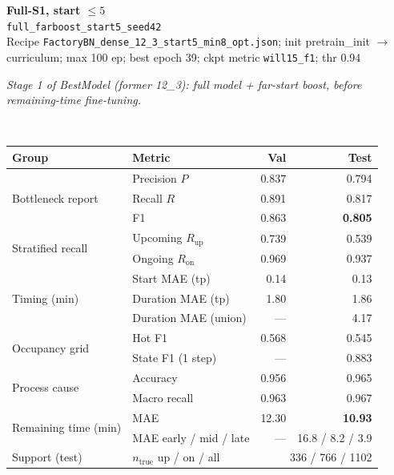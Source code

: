 \documentclass[9pt,a4paper,twocolumn]{extarticle}
\begin{document}
\noindent\begin{minipage}{\columnwidth}
\begin{center}
{\small\bfseries Full-S1, start $\le 5$}\\
{\scriptsize\texttt{full\_farboost\_start5\_seed42}}\\
{\scriptsize Recipe \texttt{FactoryBN\_dense\_12\_3\_start5\_min8\_opt.json}; init pretrain\_init $\to$ curriculum; max 100 ep; best epoch 39; ckpt metric \texttt{will15\_f1}; thr 0.94}\\[1pt]
\parbox{0.96\columnwidth}{\scriptsize\itshape Stage 1 of BestModel (former 12\_3): full model + far-start boost, before remaining-time fine-tuning.}\\[2pt]
\scriptsize\setlength{\tabcolsep}{3pt}
\begin{tabular}{llrr}
\toprule
Group & Metric & Val & Test \\
\midrule
\multirow{3}{*}{Bottleneck report}
  & Precision $P$ & 0.837 & 0.794 \\
  & Recall $R$ & 0.891 & 0.817 \\
  & F1 & 0.863 & \textbf{0.805} \\
\midrule
\multirow{2}{*}{Stratified recall}
  & Upcoming $R_{\mathrm{up}}$ & 0.739 & 0.539 \\
  & Ongoing $R_{\mathrm{on}}$ & 0.969 & 0.937 \\
\midrule
\multirow{3}{*}{Timing (min)}
  & Start MAE (tp) & 0.14 & 0.13 \\
  & Duration MAE (tp) & 1.80 & 1.86 \\
  & Duration MAE (union) & --- & 4.17 \\
\midrule
\multirow{2}{*}{Occupancy grid}
  & Hot F1 & 0.568 & 0.545 \\
  & State F1 (1 step) & --- & 0.883 \\
\midrule
\multirow{2}{*}{Process cause}
  & Accuracy & 0.956 & 0.965 \\
  & Macro recall & 0.963 & 0.967 \\
\midrule
\multirow{2}{*}{Remaining time (min)}
  & MAE & 12.30 & \textbf{10.93} \\
  & MAE early / mid / late & --- & 16.8 / 8.2 / 3.9 \\
\midrule
Support (test)
  & $n_{\mathrm{true}}$ up / on / all & \multicolumn{2}{r}{336 / 766 / 1102} \\
\bottomrule
\end{tabular}
\end{center}
\end{minipage}\par\vspace{6pt}
\end{document}
